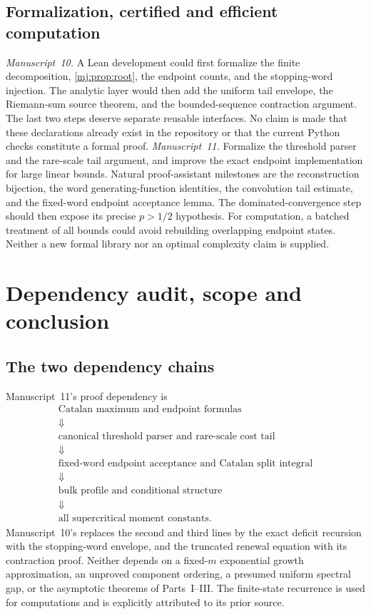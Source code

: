 \documentclass[11pt,a4paper]{article}
\theoremstyle{definition}\newaliascnt{definition}{theorem}
\theoremstyle{remark}\newaliascnt{remark}{theorem}
\begin{document}
\subsection{Formalization, certified and efficient computation}
\label{cjm:sec:mj-formal}
\emph{Manuscript~10.} A Lean development could first formalize the finite
decomposition, \cref{mj:prop:root}, the endpoint counts, and the stopping-word
injection. The analytic layer would then add the uniform tail envelope, the
Riemann-sum source theorem, and the bounded-sequence contraction argument. The
last two steps deserve separate reusable interfaces. No claim is made that
these declarations already exist in the repository or that the current Python
checks constitute a formal proof. \emph{Manuscript~11.} Formalize the
threshold parser and the rare-scale tail argument, and improve the exact
endpoint implementation for large linear bounds. Natural proof-assistant
milestones are the reconstruction bijection, the word generating-function
identities, the convolution tail estimate, and the fixed-word endpoint
acceptance lemma. The dominated-convergence step should then expose its
precise $p>1/2$ hypothesis. For computation, a batched treatment of all bounds
could avoid rebuilding overlapping endpoint states. Neither a new formal
library nor an optimal complexity claim is supplied.

\section{Dependency audit, scope and conclusion}
\label{mj:sec:audit}

\subsection{The two dependency chains}
Manuscript~11's proof dependency is
\[
 \begin{gathered}
 \text{Catalan maximum and endpoint formulas}\\
 \Downarrow\\
 \text{canonical threshold parser and rare-scale cost tail}\\
 \Downarrow\\
 \text{fixed-word endpoint acceptance and Catalan split integral}\\
 \Downarrow\\
 \text{bulk profile and conditional structure}\\
 \Downarrow\\
 \text{all supercritical moment constants}.
 \end{gathered}
\]
Manuscript~10's replaces the second and third lines by the exact deficit
recursion with the stopping-word envelope, and the truncated renewal equation
with its contraction proof. Neither depends on a fixed-$m$ exponential growth
approximation, an unproved component ordering, a presumed uniform spectral
gap, or the asymptotic theorems of Parts~I--III. The finite-state recurrence
is used for computations and is explicitly attributed to its prior source.
\end{document}
